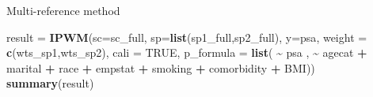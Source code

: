 \documentclass[
  ignorenonframetext,
]{beamer}
\newenvironment{Shaded}{\begin{snugshade}}{\end{snugshade}}
\newcommand{\AttributeTok}[1]{\textcolor[rgb]{0.13,0.29,0.53}{#1}}
\newcommand{\ConstantTok}[1]{\textcolor[rgb]{0.56,0.35,0.01}{#1}}
\newcommand{\FunctionTok}[1]{\textcolor[rgb]{0.13,0.29,0.53}{\textbf{#1}}}
\newcommand{\NormalTok}[1]{#1}
\newcommand{\OtherTok}[1]{\textcolor[rgb]{0.56,0.35,0.01}{#1}}
\newcommand{\SpecialCharTok}[1]{\textcolor[rgb]{0.81,0.36,0.00}{\textbf{#1}}}
\newcommand{\StringTok}[1]{\textcolor[rgb]{0.31,0.60,0.02}{#1}}
\begin{document}
\begin{frame}[fragile]{Multi-reference method}
\label{multi-reference-method-1}
\begin{Shaded}
\begin{Highlighting}[]
\NormalTok{result }\OtherTok{=} \FunctionTok{IPWM}\NormalTok{(}\AttributeTok{sc=}\NormalTok{sc\_full, }\AttributeTok{sp=}\FunctionTok{list}\NormalTok{(sp1\_full,sp2\_full), }\AttributeTok{y=}\StringTok{\textquotesingle{}psa\textquotesingle{}}\NormalTok{, }
              \AttributeTok{weight =} \FunctionTok{c}\NormalTok{(}\StringTok{\textquotesingle{}wts\_sp1\textquotesingle{}}\NormalTok{,}\StringTok{\textquotesingle{}wts\_sp2\textquotesingle{}}\NormalTok{), }\AttributeTok{cali =} \ConstantTok{TRUE}\NormalTok{,}
              \AttributeTok{p\_formula =} \FunctionTok{list}\NormalTok{( }\SpecialCharTok{\textasciitilde{}}\NormalTok{ psa ,}
                                \SpecialCharTok{\textasciitilde{}}\NormalTok{ agecat }\SpecialCharTok{+}\NormalTok{ marital }\SpecialCharTok{+}\NormalTok{ race }\SpecialCharTok{+}\NormalTok{ empstat }\SpecialCharTok{+}\NormalTok{ smoking }\SpecialCharTok{+}\NormalTok{ comorbidity }\SpecialCharTok{+}\NormalTok{  BMI))}
\FunctionTok{summary}\NormalTok{(result)}
\end{Highlighting}
\end{Shaded}


\end{frame}
\end{document}

